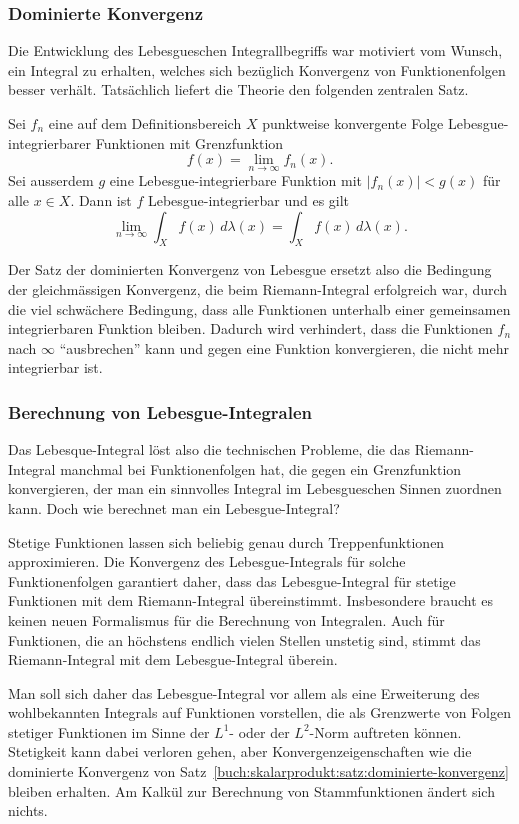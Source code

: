 %
%
\subsubsection{Dominierte Konvergenz}
Die Entwicklung des Lebesgueschen Integrallbegriffs war motiviert
vom Wunsch, ein Integral zu erhalten, welches sich bezüglich
Konvergenz von Funktionenfolgen besser verhält.
Tatsächlich liefert die Theorie den folgenden zentralen Satz.

\begin{satz}
\label{buch:skalarprodukt:satz:dominierte-konvergenz}
%
Sei $f_n$ eine auf dem Definitionsbereich $X$ punktweise konvergente
Folge Lebesgue-integrierbarer Funktionen mit Grenzfunktion 
\[
f(x) = \lim_{n\to \infty} f_n(x).
\]
Sei ausserdem $g$ eine Lebesgue-integrierbare Funktion mit
$|f_n(x)|<g(x)$ für alle $x\in X$.
Dann ist $f$ Lebesgue-integrierbar und es gilt
\[
\lim_{n\to\infty} \int_X f(x)\,d\lambda(x)
=
\int_X f(x)\,d\lambda(x).
\]
\end{satz}

Der Satz der dominierten Konvergenz von Lebesgue ersetzt also die
Bedingung der gleichmässigen Konvergenz, die beim Riemann-Integral
erfolgreich war, durch die viel schwächere Bedingung, dass alle
Funktionen unterhalb einer gemeinsamen integrierbaren Funktion bleiben.
Dadurch wird verhindert, dass die Funktionen $f_n$ nach $\infty$
``ausbrechen'' kann und gegen eine Funktion konvergieren, die nicht
mehr integrierbar ist.


%
%
\subsubsection{Berechnung von Lebesgue-Integralen}
Das Lebesque-Integral löst also die technischen Probleme, die das
Riemann-Integral manchmal bei Funktionenfolgen hat, die gegen ein
Grenzfunktion konvergieren, der man ein sinnvolles Integral im
Lebesgueschen Sinnen zuordnen kann.
Doch wie berechnet man ein Lebesgue-Integral?

Stetige Funktionen lassen sich beliebig genau durch Treppenfunktionen
approximieren.
Die Konvergenz des Lebesgue-Integrals für solche Funktionenfolgen
garantiert daher, dass das Lebesgue-Integral für stetige
Funktionen mit dem Riemann-Integral übereinstimmt.
Insbesondere braucht es keinen neuen Formalismus für die 
Berechnung von Integralen.
Auch für Funktionen, die an höchstens endlich vielen Stellen unstetig
sind, stimmt das Riemann-Integral mit dem Lebesgue-Integral überein.

Man soll sich daher das Lebesgue-Integral vor allem als eine 
Erweiterung des wohlbekannten Integrals auf Funktionen vorstellen,
die als Grenzwerte von Folgen stetiger Funktionen im Sinne der $L^1$-
oder der $L^2$-Norm auftreten können.
Stetigkeit kann dabei verloren gehen, aber Konvergenzeigenschaften
wie die dominierte Konvergenz von
Satz~\ref{buch:skalarprodukt:satz:dominierte-konvergenz}
bleiben erhalten.
Am Kalkül zur Berechnung von Stammfunktionen ändert sich nichts.



